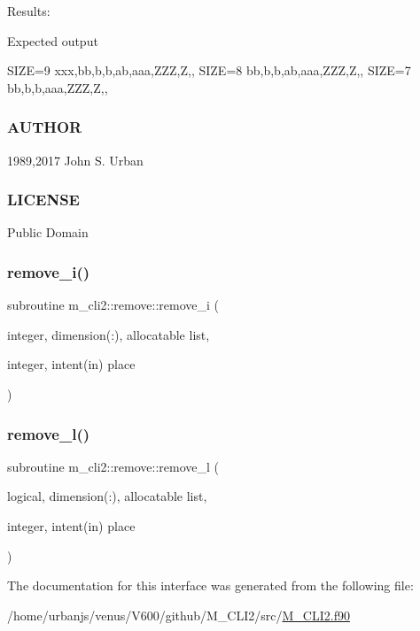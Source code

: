 Results\+:

Expected output

S\+I\+ZE=9 xxx,bb,b,b,ab,aaa,Z\+ZZ,Z,, S\+I\+ZE=8 bb,b,b,ab,aaa,Z\+ZZ,Z,, S\+I\+ZE=7 bb,b,b,aaa,Z\+ZZ,Z,,

\subsubsection*{A\+U\+T\+H\+OR}

1989,2017 John S. Urban \subsubsection*{L\+I\+C\+E\+N\+SE}

Public Domain \mbox{\label{interfacem__cli2_1_1remove_a4a30f737b41e6cfca58ef2842d633b27}} 
\subsubsection{\texorpdfstring{remove\+\_\+i()}{remove\_i()}}
{\footnotesize\ttfamily subroutine m\+\_\+cli2\+::remove\+::remove\+\_\+i (\begin{DoxyParamCaption}\item[{integer, dimension(\+:), allocatable}]{list,  }\item[{integer, intent(in)}]{place }\end{DoxyParamCaption})\hspace{0.3cm}{\ttfamily [private]}}

\mbox{\label{interfacem__cli2_1_1remove_a72934a0b165dc3d178ff7cbe6117a5b3}} 
\subsubsection{\texorpdfstring{remove\+\_\+l()}{remove\_l()}}
{\footnotesize\ttfamily subroutine m\+\_\+cli2\+::remove\+::remove\+\_\+l (\begin{DoxyParamCaption}\item[{logical, dimension(\+:), allocatable}]{list,  }\item[{integer, intent(in)}]{place }\end{DoxyParamCaption})\hspace{0.3cm}{\ttfamily [private]}}



The documentation for this interface was generated from the following file\+:\begin{DoxyCompactItemize}
\item 
/home/urbanjs/venus/\+V600/github/\+M\+\_\+\+C\+L\+I2/src/\mbox{\hyperlink{M__CLI2_8f90}{M\+\_\+\+C\+L\+I2.\+f90}}\end{DoxyCompactItemize}

